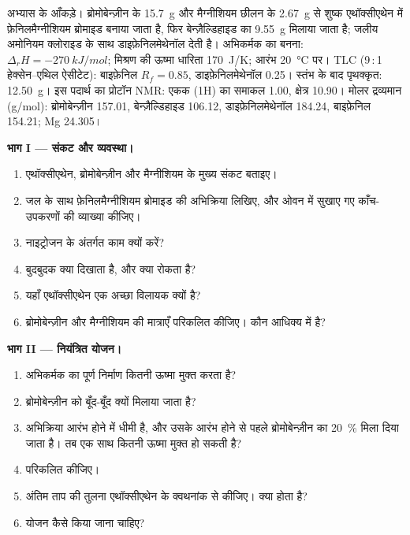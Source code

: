 \begin{problem}
\label{pb:b2:lab-techniques-2:1}
अभ्यास के आँकड़े। ब्रोमोबेन्ज़ीन के \qty{15.7}{g} और मैग्नीशियम छीलन के \qty{2.67}{g} से शुष्क एथॉक्सीएथेन में
फ़ेनिलमैग्नीशियम ब्रोमाइड बनाया जाता है, फिर बेन्ज़ैल्डिहाइड का \qty{9.55}{g} मिलाया जाता है; जलीय अमोनियम क्लोराइड के साथ
 डाइफ़ेनिलमेथेनॉल देती है। अभिकर्मक का बनना: $\Delta_rH =
\qty{-270}{kJ/mol}$; मिश्रण की ऊष्मा धारिता \qty{170}{J/K}; आरंभ \qty{20}{\degreeCelsius} पर। TLC
(9\,:\,1 हेक्सेन--एथिल ऐसीटेट): बाइफ़ेनिल $R_f = 0.85$, डाइफ़ेनिलमेथेनॉल 0.25। स्तंभ के बाद पृथक्कृत:
\qty{12.50}{g}। इस पदार्थ का प्रोटॉन NMR:  एकक (1H) का समाकल 1.00, 
क्षेत्र 10.90। मोलर द्रव्यमान (\unit{g/mol}): ब्रोमोबेन्ज़ीन 157.01, बेन्ज़ैल्डिहाइड 106.12, डाइफ़ेनिलमेथेनॉल
184.24, बाइफ़ेनिल 154.21; Mg 24.305।

\medskip
\noindent\textbf{भाग I --- संकट और व्यवस्था।}
\begin{enumerate}
  \item एथॉक्सीएथेन, ब्रोमोबेन्ज़ीन और मैग्नीशियम के मुख्य संकट बताइए।
  \item जल के साथ फ़ेनिलमैग्नीशियम ब्रोमाइड की अभिक्रिया लिखिए, और ओवन में सुखाए गए काँच-उपकरणों की व्याख्या कीजिए।
  \item नाइट्रोजन के अंतर्गत काम क्यों करें?
  \item बुदबुदक क्या दिखाता है, और क्या रोकता है?
  \item यहाँ एथॉक्सीएथेन एक अच्छा विलायक क्यों है?
  \item ब्रोमोबेन्ज़ीन और मैग्नीशियम की मात्राएँ परिकलित कीजिए। कौन आधिक्य में है?
\end{enumerate}

\medskip
\noindent\textbf{भाग II --- नियंत्रित योजन।}
\begin{enumerate}[resume]
  \item अभिकर्मक का पूर्ण निर्माण कितनी ऊष्मा मुक्त करता है?
  \item ब्रोमोबेन्ज़ीन को बूँद-बूँद क्यों मिलाया जाता है?
  \item अभिक्रिया आरंभ होने में धीमी है, और उसके आरंभ होने से पहले ब्रोमोबेन्ज़ीन का 20~\% मिला दिया जाता है। तब एक साथ
        कितनी ऊष्मा मुक्त हो सकती है?
  \item {} परिकलित कीजिए।
  \item अंतिम ताप की तुलना एथॉक्सीएथेन के क्वथनांक से कीजिए। क्या होता है?
  \item योजन कैसे किया जाना चाहिए?
\end{enumerate}


\end{problem}
